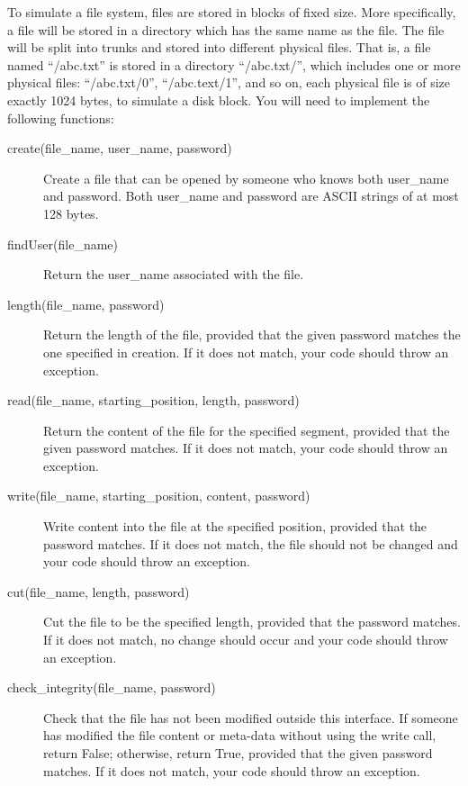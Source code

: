 \documentclass[11pt]{article}
\begin{document}
To simulate a file system, files are stored in blocks of fixed size. More specifically, a file will be stored in a directory which has the same name as the file. The file will be split into trunks and stored into different physical files.  That is, a file named ``/abc.txt'' is stored in a directory ``/abc.txt/'', which includes one or more physical files: ``/abc.txt/0'', ``/abc.text/1'', and so on, each physical file is of size exactly 1024 bytes, to simulate a disk block. You will need to implement the following functions:
\begin{description}
 \item[create(file\_name, user\_name, password)]
Create a file that can be opened by someone who knows both user\_name and password.  Both user\_name and password are ASCII strings of at most 128 bytes.

 \item[findUser(file\_name)]
Return the user\_name associated with the file.

 \item[length(file\_name, password)]
Return the length of the file, provided that the given password matches the one specified in creation.  If it does not match, your code should throw an exception.

 \item[read(file\_name, starting\_position, length, password)]
Return the content of the file for the specified segment, provided that the given password matches.  If it does not match, your code should throw an exception.

 \item[write(file\_name, starting\_position, content, password)]
Write content into the file at the specified position, provided that the password matches.  If it does not match, the file should not be changed and your code should throw an exception.


 \item[cut(file\_name, length, password)]
Cut the file to be the specified length, provided that the password matches.  If it does not match, no change should occur and your code should throw an exception.

 \item[check\_integrity(file\_name, password)]
Check that the file has not been modified outside this interface.  If someone has modified the file content or meta-data without using the write call, return False; otherwise, return True, provided that the given password matches. If it does not match, your code should throw an exception.
\end{description}
\end{document}

